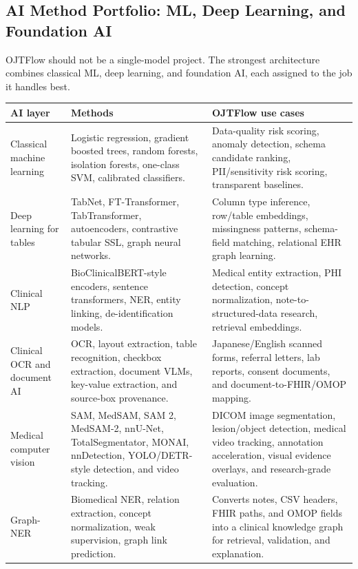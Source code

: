 \subsection{AI Method Portfolio: ML, Deep Learning, and Foundation AI}

OJTFlow should not be a single-model project. The strongest architecture combines classical ML, deep learning, and foundation AI, each assigned to the job it handles best.

\begin{longtable}{p{}p{}p{}}
\toprule
\textbf{AI layer} & \textbf{Methods} & \textbf{OJTFlow use cases} \\
\midrule
Classical machine learning & Logistic regression, gradient boosted trees, random forests, isolation forests, one-class SVM, calibrated classifiers. & Data-quality risk scoring, anomaly detection, schema candidate ranking, PII/sensitivity risk scoring, transparent baselines. \\
\addlinespace
Deep learning for tables & TabNet, FT-Transformer, TabTransformer, autoencoders, contrastive tabular SSL, graph neural networks. & Column type inference, row/table embeddings, missingness patterns, schema-field matching, relational EHR graph learning. \\
\addlinespace
Clinical NLP & BioClinicalBERT-style encoders, sentence transformers, NER, entity linking, de-identification models. & Medical entity extraction, PHI detection, concept normalization, note-to-structured-data research, retrieval embeddings. \\
\addlinespace
Clinical OCR and document AI & OCR, layout extraction, table recognition, checkbox extraction, document VLMs, key-value extraction, and source-box provenance. & Japanese/English scanned forms, referral letters, lab reports, consent documents, and document-to-FHIR/OMOP mapping. \\
\addlinespace
Medical computer vision & SAM, MedSAM, SAM 2, MedSAM-2, nnU-Net, TotalSegmentator, MONAI, nnDetection, YOLO/DETR-style detection, and video tracking. & DICOM image segmentation, lesion/object detection, medical video tracking, annotation acceleration, visual evidence overlays, and research-grade evaluation. \\
\addlinespace
Graph-NER & Biomedical NER, relation extraction, concept normalization, weak supervision, graph link prediction. & Converts notes, CSV headers, FHIR paths, and OMOP fields into a clinical knowledge graph for retrieval, validation, and explanation. \\

\end{longtable}
